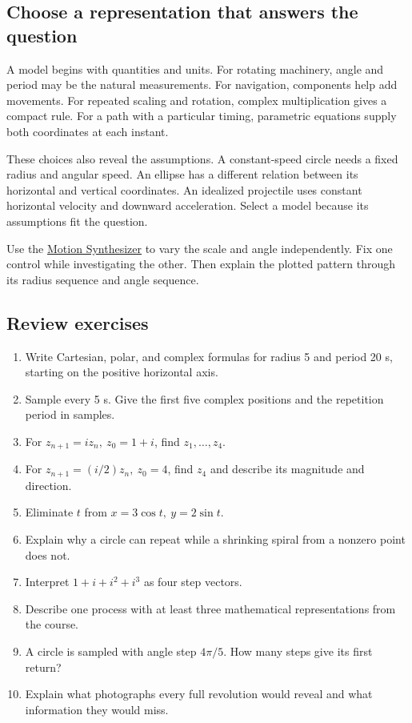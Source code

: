 \hypertarget{m10-choose-a-representation-that-answers-the-question}{%
\subsection{Choose a representation that answers the question}\label{m10-choose-a-representation-that-answers-the-question}}

A model begins with quantities and units. For rotating machinery, angle and period may be the natural measurements. For navigation, components help add movements. For repeated scaling and rotation, complex multiplication gives a compact rule. For a path with a particular timing, parametric equations supply both coordinates at each instant.

These choices also reveal the assumptions. A constant-speed circle needs a fixed radius and angular speed. An ellipse has a different relation between its horizontal and vertical coordinates. An idealized projectile uses constant horizontal velocity and downward acceleration. Select a model because its assumptions fit the question.

Use the \href{https://bobovski66.github.io/PrecalculusII/demos/motion_synthesis.html}{Motion Synthesizer} to vary the scale and angle independently. Fix one control while investigating the other. Then explain the plotted pattern through its radius sequence and angle sequence.

\hypertarget{m10-review-exercises}{%
\subsection{Review exercises}\label{m10-review-exercises}}

\begin{enumerate}
\def\labelenumi{\arabic{enumi}.}
\tightlist
\item
  Write Cartesian, polar, and complex formulas for radius 5 and period 20 s, starting on the positive horizontal axis.
\item
  Sample every 5 s. Give the first five complex positions and the repetition period in samples.
\item
  For \(z_{n+1}=iz_n,\ z_0=1+i\), find \(z_1,\ldots,z_4\).
\item
  For \(z_{n+1}=(i/2)z_n,\ z_0=4\), find \(z_4\) and describe its magnitude and direction.
\item
  Eliminate \(t\) from \(x=3\cos t,\ y=2\sin t\).
\item
  Explain why a circle can repeat while a shrinking spiral from a nonzero point does not.
\item
  Interpret \(1+i+i^2+i^3\) as four step vectors.
\item
  Describe one process with at least three mathematical representations from the course.
\item
  A circle is sampled with angle step \(4\pi/5\). How many steps give its first return?
\item
  Explain what photographs every full revolution would reveal and what information they would miss.
\end{enumerate}

